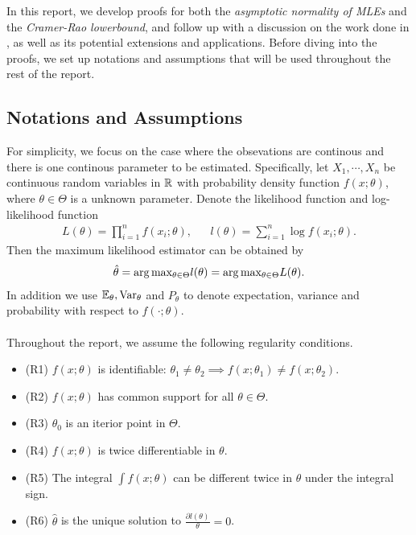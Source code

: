 In this report, we develop proofs for both the \emph{asymptotic normality of MLEs} and the \emph{Cramer-Rao lowerbound}, and follow up with a discussion on the work done in \cite{anastasiou2015bounds}, as well as its potential extensions and applications. Before diving into the proofs, we set up notations and assumptions that will be used throughout the rest of the report.
\subsection{Notations and Assumptions} \label{sec:notation}
For simplicity, we focus on the case where the obsevations are continous and there is one continous parameter to be estimated. Specifically, let $X_1,\cdots,X_n$ be \iid continuous random variables in $\mathbb{R}$ with probability density function $f(x;\theta)$, where $\theta \in \Theta$ is a unknown parameter. Denote the likelihood function and log-likelihood function
\begin{align*}
L(\theta) = \prod_{i=1}^n f(x_i;\theta), && l(\theta) = \sum_{i=1}^n \log f(x_i;\theta).
\end{align*}
Then the maximum likelihood estimator can be obtained by
\begin{align*}
\hat{\theta} = \arg\text{max}_{\theta\in\Theta}l(\theta) = \arg\text{max}_{\theta\in\Theta}L(\theta).
\end{align*}
In addition we use $\mathbb{E}_{\theta}, \text{Var}_\theta$ and $P_{\theta}$ to denote expectation, variance and probability with respect to $f(\cdot;\theta)$.\\\\
Throughout the report, we assume the following regularity conditions.
\begin{itemize}
\item (R1) $f(x;\theta)$ is identifiable: $\theta_1\neq\theta_2\implies f(x;\theta_1)\neq f(x;\theta_2)$.
\item (R2) $f(x;\theta)$ has common support for all $\theta\in\Theta$.
\item (R3) $\theta_0$ is an iterior point in $\Theta$.
\item (R4) $f(x;\theta)$ is twice differentiable in $\theta$.
\item (R5) The integral $\int f(x;\theta)$ can be different twice in $\theta$ under the integral sign.
\item (R6) $\hat{\theta}$ is the unique solution to $\frac{\partial l(\theta)}{\theta} = 0$.
\end{itemize}
